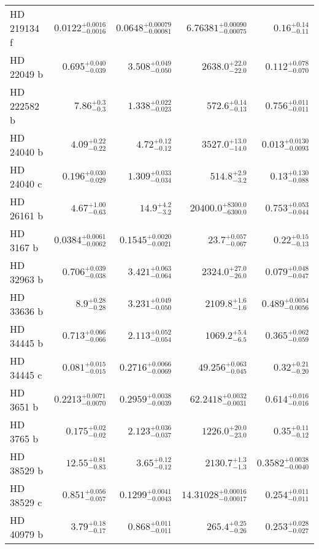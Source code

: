 \begin{longtable*}{lrrrr}
HD 219134 f & $0.0122^{+0.0016}_{-0.0016}$ & $0.0648^{+0.00079}_{-0.00081}$ & $6.76381^{+0.00090}_{-0.00075}$ & $0.16^{+0.14}_{-0.11}$ \\ 
HD 22049 b & $0.695^{+0.040}_{-0.039}$ & $3.508^{+0.049}_{-0.050}$ & $2638.0^{+22.0}_{-22.0}$ & $0.112^{+0.078}_{-0.070}$ \\ 
HD 222582 b & $7.86^{+0.3}_{-0.3}$ & $1.338^{+0.022}_{-0.023}$ & $572.6^{+0.14}_{-0.13}$ & $0.756^{+0.011}_{-0.011}$ \\ 
HD 24040 b & $4.09^{+0.22}_{-0.22}$ & $4.72^{+0.12}_{-0.12}$ & $3527.0^{+13.0}_{-14.0}$ & $0.013^{+0.0130}_{-0.0093}$ \\ 
HD 24040 c & $0.196^{+0.030}_{-0.029}$ & $1.309^{+0.033}_{-0.034}$ & $514.8^{+2.9}_{-3.2}$ & $0.13^{+0.130}_{-0.088}$ \\ 
HD 26161 b & $4.67^{+1.00}_{-0.63}$ & $14.9^{+4.2}_{-3.2}$ & $20400.0^{+8300.0}_{-6300.0}$ & $0.753^{+0.053}_{-0.044}$ \\ 
HD 3167 b & $0.0384^{+0.0061}_{-0.0062}$ & $0.1545^{+0.0020}_{-0.0021}$ & $23.7^{+0.057}_{-0.067}$ & $0.22^{+0.15}_{-0.13}$ \\ 
HD 32963 b & $0.706^{+0.039}_{-0.038}$ & $3.421^{+0.063}_{-0.064}$ & $2324.0^{+27.0}_{-26.0}$ & $0.079^{+0.048}_{-0.047}$ \\ 
HD 33636 b & $8.9^{+0.28}_{-0.28}$ & $3.231^{+0.049}_{-0.050}$ & $2109.8^{+1.6}_{-1.6}$ & $0.489^{+0.0054}_{-0.0056}$ \\ 
HD 34445 b & $0.713^{+0.066}_{-0.066}$ & $2.113^{+0.052}_{-0.054}$ & $1069.2^{+5.4}_{-6.5}$ & $0.365^{+0.062}_{-0.059}$ \\ 
HD 34445 c & $0.081^{+0.015}_{-0.015}$ & $0.2716^{+0.0066}_{-0.0069}$ & $49.256^{+0.063}_{-0.045}$ & $0.32^{+0.21}_{-0.20}$ \\ 
HD 3651 b & $0.2213^{+0.0071}_{-0.0070}$ & $0.2959^{+0.0038}_{-0.0039}$ & $62.2418^{+0.0032}_{-0.0031}$ & $0.614^{+0.016}_{-0.016}$ \\ 
HD 3765 b & $0.175^{+0.02}_{-0.02}$ & $2.123^{+0.036}_{-0.037}$ & $1226.0^{+20.0}_{-23.0}$ & $0.35^{+0.11}_{-0.12}$ \\ 
HD 38529 b & $12.55^{+0.81}_{-0.83}$ & $3.65^{+0.12}_{-0.12}$ & $2130.7^{+1.3}_{-1.3}$ & $0.3582^{+0.0038}_{-0.0040}$ \\ 
HD 38529 c & $0.851^{+0.056}_{-0.057}$ & $0.1299^{+0.0041}_{-0.0043}$ & $14.31028^{+0.00016}_{-0.00017}$ & $0.254^{+0.011}_{-0.011}$ \\ 
HD 40979 b & $3.79^{+0.18}_{-0.17}$ & $0.868^{+0.011}_{-0.011}$ & $265.4^{+0.25}_{-0.26}$ & $0.253^{+0.028}_{-0.027}$ \\ 

\end{longtable*}
